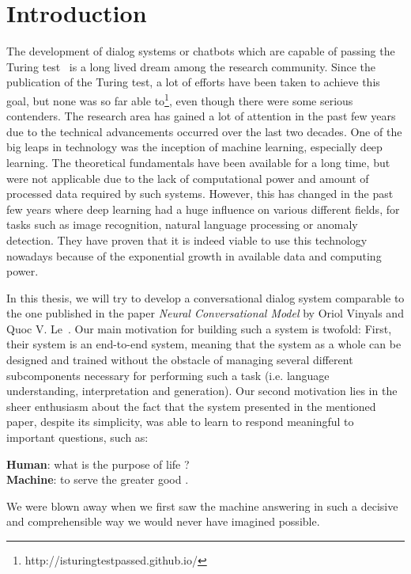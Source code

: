 \chapter{Introduction}
The development of dialog systems or chatbots which are capable of passing the Turing test~\cite{Turing:1950} is a long lived dream among the research community. Since the publication of the Turing test, a lot of efforts have been taken to achieve this goal, but none was so far able to\footnote{http://isturingtestpassed.github.io/}, even though there were some serious contenders. The research area has gained a lot of attention in the past few years due to the technical advancements occurred over the last two decades. One of the big leaps in technology was the inception of machine learning, especially deep learning. The theoretical fundamentals have been available for a long time, but were not applicable due to the lack of computational power and amount of processed data required by such systems. However, this has changed in the past few years where deep learning had a huge influence on various different fields, for tasks such as image recognition, natural language processing or anomaly detection. They have proven that it is indeed viable to use this technology nowadays because of the exponential growth in available data and computing power.

In this thesis, we will try to develop a conversational dialog system comparable to the one published in the paper \emph{Neural Conversational Model} by Oriol Vinyals and Quoc V. Le~\cite{Vinyals:2015}. Our main motivation for building such a system is twofold: First, their system is an end-to-end system, meaning that the system as a whole can be designed and trained without the obstacle of managing several different subcomponents necessary for performing such a task (i.e. language understanding, interpretation and generation). Our second motivation lies in the sheer enthusiasm about the fact that the system presented in the mentioned paper, despite its simplicity, was able to learn to respond meaningful to important questions, such as:

\begin{center}	
	\textbf{Human}: what is the purpose of life ?\\
	\textbf{Machine}: to serve the greater good .
\end{center}

We were blown away when we first saw the machine answering in such a decisive and comprehensible way we would never have imagined possible.

